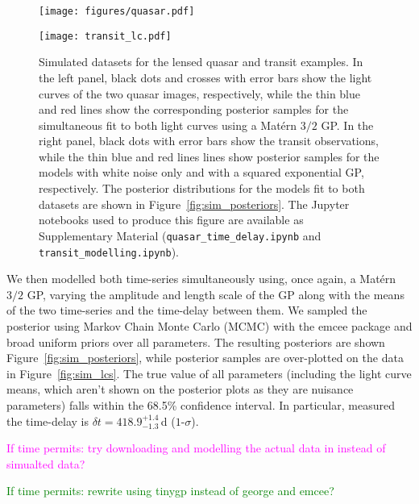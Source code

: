 \documentclass[letterpaper]{ar-1col}
\newcommand{\suz}[1]{\textcolor{magenta}{#1}}
\newcommand{\dan}[1]{\textcolor{green}{#1}}
\begin{document}
\begin{figure}[h]
  \centering
  \begin{minipage}[t]{0.48\linewidth}
    \texttt{[image: figures/quasar.pdf]} 
  \end{minipage} \hfill
  \begin{minipage}[t]{0.48\linewidth}
    \texttt{[image: transit\_lc.pdf]}
  \end{minipage}
  \caption{Simulated datasets for the lensed quasar and transit examples. In the left panel, black dots and crosses with error bars show the light curves of the two quasar images, respectively, while the thin blue and red lines show the corresponding posterior samples for the simultaneous fit to both light curves using a Mat{\'e}rn $3/2$ GP.  In the right panel, black dots with error bars show the transit observations, while the thin blue and red lines lines show posterior samples for the models with white noise only and with a squared exponential GP, respectively. The posterior distributions for the models fit to both datasets are shown in Figure~\protect\ref{fig:sim_posteriors}. The {\sc Jupyter} notebooks used to produce this figure are available as Supplementary Material (\texttt{quasar\_time\_delay.ipynb} and \texttt{transit\_modelling.ipynb}).}
  \label{fig:quasar}
\end{figure}

We then modelled both time-series simultaneously using, once again, a Mat{\'e}rn $3/2$ GP, varying the amplitude and length scale of the GP along with the means of the two time-series and the time-delay between them. We sampled the posterior using Markov Chain Monte Carlo (MCMC) with the {\sc emcee} package \citep{emcee} and broad uniform priors over all parameters. The resulting posteriors are shown Figure~\ref{fig:sim_posteriors}, while posterior samples are over-plotted on the data in Figure~\ref{fig:sim_lcs}. The true value of all parameters (including the light curve means, which aren't shown on the posterior plots as they are nuisance parameters) falls within the 68.5\% confidence interval. In particular, measured the time-delay is $\delta t = 418.9_{-1.3}^{+1.4}$\,d ($1$-$\sigma$).

\suz{If time permits: try downloading and modelling the actual data in \citet{1989A&A...215....1V} instead of simualted data?}

\dan{If time permits: rewrite using {\sc tinygp} instead of {\sc george} and {\sc emcee}?}
\end{document}
